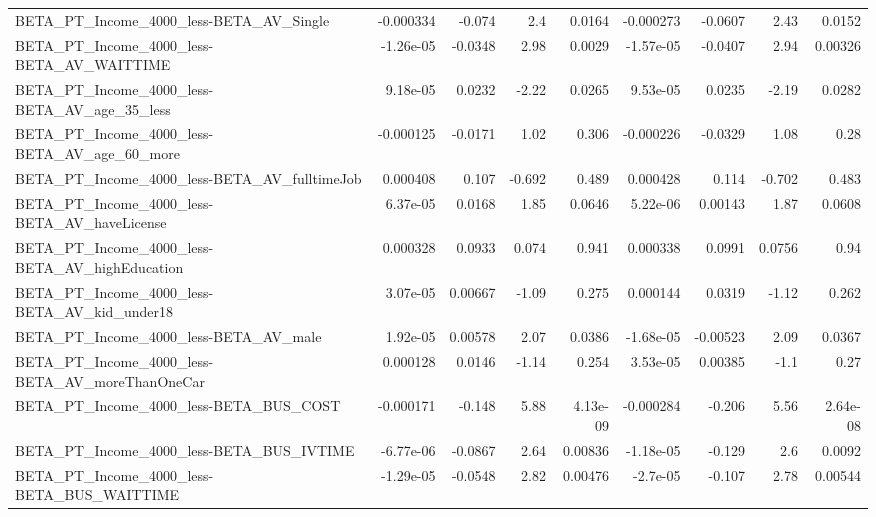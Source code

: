 \begin{tabular}{lrrrrrrrr}
BETA\_PT\_Income\_4000\_less-BETA\_AV\_Single            &   -0.000334 &       -0.074 &       2.4 &   0.0164 &  -0.000273 &     -0.0607 &         2.43 &        0.0152 \\
BETA\_PT\_Income\_4000\_less-BETA\_AV\_WAITTIME          &   -1.26e-05 &      -0.0348 &      2.98 &   0.0029 &  -1.57e-05 &     -0.0407 &         2.94 &       0.00326 \\
BETA\_PT\_Income\_4000\_less-BETA\_AV\_age\_35\_less       &    9.18e-05 &       0.0232 &     -2.22 &   0.0265 &   9.53e-05 &      0.0235 &        -2.19 &        0.0282 \\
BETA\_PT\_Income\_4000\_less-BETA\_AV\_age\_60\_more       &   -0.000125 &      -0.0171 &      1.02 &    0.306 &  -0.000226 &     -0.0329 &         1.08 &          0.28 \\
BETA\_PT\_Income\_4000\_less-BETA\_AV\_fulltimeJob       &    0.000408 &        0.107 &    -0.692 &    0.489 &   0.000428 &       0.114 &       -0.702 &         0.483 \\
BETA\_PT\_Income\_4000\_less-BETA\_AV\_haveLicense       &    6.37e-05 &       0.0168 &      1.85 &   0.0646 &   5.22e-06 &     0.00143 &         1.87 &        0.0608 \\
BETA\_PT\_Income\_4000\_less-BETA\_AV\_highEducation     &    0.000328 &       0.0933 &     0.074 &    0.941 &   0.000338 &      0.0991 &       0.0756 &          0.94 \\
BETA\_PT\_Income\_4000\_less-BETA\_AV\_kid\_under18       &    3.07e-05 &      0.00667 &     -1.09 &    0.275 &   0.000144 &      0.0319 &        -1.12 &         0.262 \\
BETA\_PT\_Income\_4000\_less-BETA\_AV\_male              &    1.92e-05 &      0.00578 &      2.07 &   0.0386 &  -1.68e-05 &    -0.00523 &         2.09 &        0.0367 \\
BETA\_PT\_Income\_4000\_less-BETA\_AV\_moreThanOneCar    &    0.000128 &       0.0146 &     -1.14 &    0.254 &   3.53e-05 &     0.00385 &         -1.1 &          0.27 \\
BETA\_PT\_Income\_4000\_less-BETA\_BUS\_COST             &   -0.000171 &       -0.148 &      5.88 & 4.13e-09 &  -0.000284 &      -0.206 &         5.56 &      2.64e-08 \\
BETA\_PT\_Income\_4000\_less-BETA\_BUS\_IVTIME           &   -6.77e-06 &      -0.0867 &      2.64 &  0.00836 &  -1.18e-05 &      -0.129 &          2.6 &        0.0092 \\
BETA\_PT\_Income\_4000\_less-BETA\_BUS\_WAITTIME         &   -1.29e-05 &      -0.0548 &      2.82 &  0.00476 &   -2.7e-05 &      -0.107 &         2.78 &       0.00544 \\

\end{tabular}
